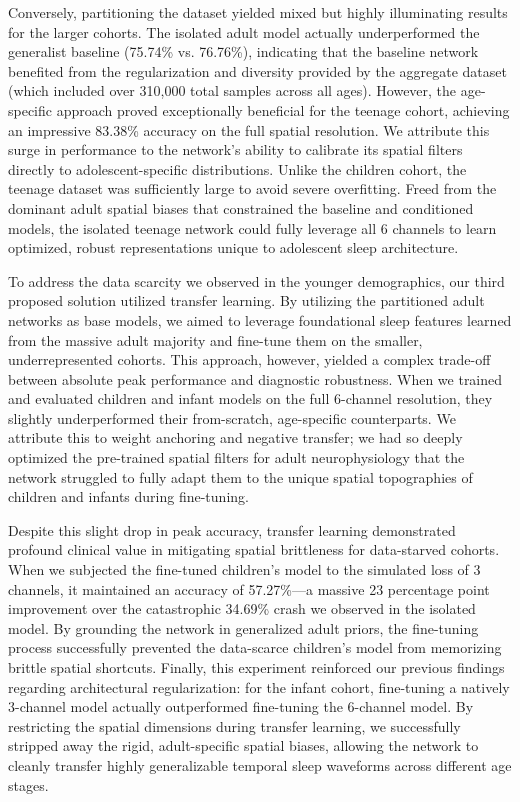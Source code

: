 Conversely, partitioning the dataset yielded mixed but highly illuminating 
results for the larger cohorts. The isolated adult model actually underperformed 
the generalist baseline (75.74\% vs. 76.76\%), indicating that the baseline network
benefited from the regularization and diversity provided by the aggregate dataset
(which included over 310,000 total samples across all ages). However, the
age-specific approach proved exceptionally beneficial for the teenage cohort,
achieving an impressive 83.38\% accuracy on the full spatial resolution. We attribute
this surge in performance to the network's ability to calibrate its spatial filters
directly to adolescent-specific distributions. Unlike the children
cohort, the teenage dataset was sufficiently large to avoid severe overfitting.
Freed from the dominant adult spatial biases that constrained the baseline and
conditioned models, the isolated teenage network could fully leverage all 6
channels to learn optimized, robust representations unique to adolescent sleep
architecture.

To address the data scarcity we observed in the younger demographics, our third
proposed solution utilized transfer learning. By utilizing the partitioned adult
networks as base models, we aimed to leverage foundational sleep features learned
from the massive adult majority and fine-tune them on the smaller,
underrepresented cohorts. This approach, however, yielded a complex trade-off
between absolute peak performance and diagnostic robustness. When we trained and
evaluated children and infant models on the full 6-channel resolution, they slightly
underperformed their from-scratch, age-specific counterparts. We attribute this
to weight anchoring and negative transfer; we had so deeply optimized the pre-trained spatial filters
for adult neurophysiology that the network struggled to fully
adapt them to the unique spatial topographies of children and infants during fine-tuning.

Despite this slight drop in peak accuracy, transfer learning demonstrated
profound clinical value in mitigating spatial brittleness for data-starved
cohorts. When we subjected the fine-tuned children's model to the simulated loss
of 3 channels, it maintained an accuracy of 57.27\%—a massive 23 percentage point 
improvement over the catastrophic 34.69\% crash we observed in the isolated model. 
By grounding the network in generalized adult priors, the fine-tuning process
successfully prevented the data-scarce children's model from memorizing
brittle spatial shortcuts. Finally, this experiment reinforced our previous findings
regarding architectural regularization: for the infant cohort,
fine-tuning a natively 3-channel model actually outperformed fine-tuning the
6-channel model. By restricting the spatial dimensions during transfer learning,
we successfully stripped away the rigid, adult-specific spatial biases, allowing
the network to cleanly transfer highly generalizable temporal sleep waveforms
across different age stages.

